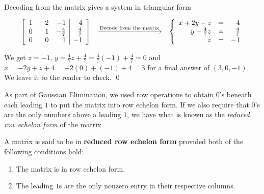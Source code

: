\documentclass{ximera}
\begin{document}
\begin{example}
\[\begin{array}{ccc}
\end{array}\]

Decoding from the matrix gives a system in triangular form

\[ \begin{array}{ccc}

\left[ \begin{array}{rrr|r} 
1 & \hphantom{-}2 & -1 & 4 \\ 
0 & 1 & -\frac{4}{7} & \frac{4}{7} \\ 
0 & 0 &1 & -1 \\ 
\end{array} \right]  
& 
\xrightarrow{\text{Decode from the matrix}} 
& 
\left \{ \begin{array}{rcr} 
x + 2y-z & = & 4 \\ 
y - \frac{4}{7} z & = & \frac{4}{7} \\ 
z & = & -1 \end{array} \right.

\end{array}\]

We get $z=-1$,  $y = \frac{4}{7} z + \frac{4}{7} = \frac{4}{7}(-1)+\frac{4}{7} = 0$ and $x = -2y+z+4 = -2(0)+(-1)+4 = 3$ for a final answer of $(3,0,-1)$.  We leave it to the reader to check. \qed

\end{example}

As part of Gaussian Elimination, we used row operations to obtain $0$'s beneath each leading $1$ to put the matrix into row echelon form.  If we also require that $0$'s are the only numbers above a leading $1$, we have what is known as  the   \textit{reduced row echelon form} of the matrix.

\smallskip


\begin{definition} \label{reducedrowechelonform} A matrix is said to be in \textbf{reduced row echelon form} provided both of the following conditions hold:

\begin{enumerate}

\item  The matrix is in row echelon form.

\item The leading $1$s are the only nonzero entry in their respective columns.

\end{enumerate}

\end{definition}
\end{document}
